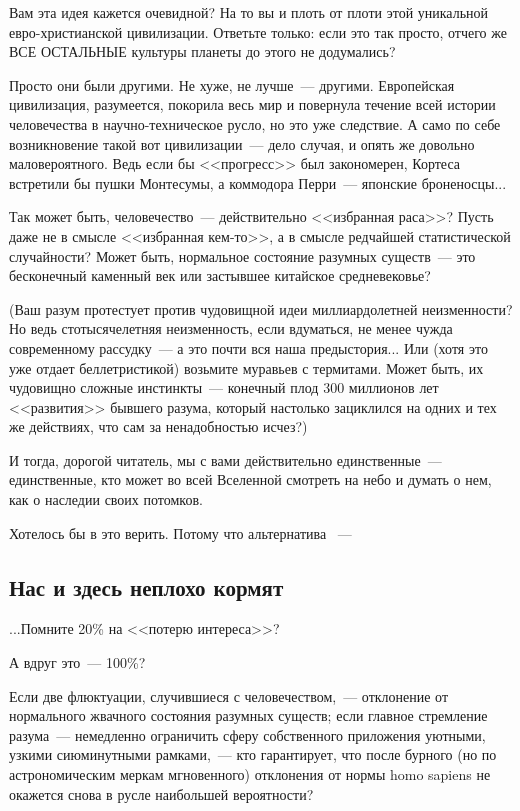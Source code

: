 \documentclass{scrbook}
\newcommand{\flqq}{<<}
\newcommand{\frqq}{>>}
\newcommand{\mdash}{~--- }
\newcommand{\commamdash}{~--- } %
\newcommand{\essaysection}[1]{\subsection*{#1}\nopagebreak}
\begin{document}
Вам эта идея кажется очевидной? На то вы и плоть от плоти этой уникальной евро-христианской цивилизации. Ответьте только: если это так просто, отчего же ВСЕ ОСТАЛЬНЫЕ культуры планеты до этого не додумались?

Просто они были другими. Не хуже, не лучше{\mdash}другими. Европейская цивилизация, разумеется, покорила весь мир и повернула течение всей истории человечества в научно-техническое русло, но это уже следствие. А само по себе возникновение такой вот цивилизации{\mdash}дело случая, и опять же довольно маловероятного. Ведь если бы {\flqq}прогресс{\frqq} был закономерен, Кортеса встретили бы пушки Монтесумы, а коммодора Перри{\mdash}японские броненосцы...

Так может быть, человечество{\mdash}действительно {\flqq}избранная раса{\frqq}? Пусть даже не в смысле {\flqq}избранная кем-то{\frqq}, а в смысле редчайшей статистической случайности? Может быть, нормальное состояние разумных существ{\mdash}это бесконечный каменный век или застывшее китайское средневековье?

(Ваш разум протестует против чудовищной идеи миллиардолетней неизменности? Но ведь стотысячелетняя неизменность, если вдуматься, не менее чужда современному рассудку{\mdash}а это почти вся наша предыстория... Или (хотя это уже отдает беллетристикой) возьмите муравьев с термитами. Может быть, их чудовищно сложные инстинкты{\mdash}конечный плод 300 миллионов лет {\flqq}развития{\frqq} бывшего разума, который настолько зациклился на одних и тех же действиях, что сам за ненадобностью исчез?)

И тогда, дорогой читатель, мы с вами действительно единственные{\mdash}единственные, кто может во всей Вселенной смотреть на небо и думать о нем, как о наследии своих потомков.

Хотелось бы в это верить. Потому что альтернатива {\mdash}

\essaysection{Нас и здесь неплохо кормят}

...Помните 20\% на {\flqq}потерю интереса{\frqq}?

А вдруг это{\mdash}100\%?

Если две флюктуации, случившиеся с человечеством,{\commamdash}отклонение от нормального жвачного состояния разумных существ; если главное стремление разума{\mdash}немедленно ограничить сферу собственного приложения уютными, узкими сиюминутными рамками,{\commamdash}кто гарантирует, что после бурного (но по астрономическим меркам мгновенного) отклонения от нормы homo sapiens не окажется снова в русле наибольшей вероятности?
\end{document}
